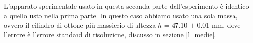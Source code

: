 L'apparato sperimentale usato in questa seconda parte dell'esperimento è
identico a quello usto nella prima parte. In questo caso abbiamo usato una sola massa,
ovvero il cilindro di ottone più massiccio di altezza $h$ = 47.10 $\pm$ 0.01 mm,
dove l'errore è l'errore standard di risoluzione, discusso in sezione \ref{l_medie}.
